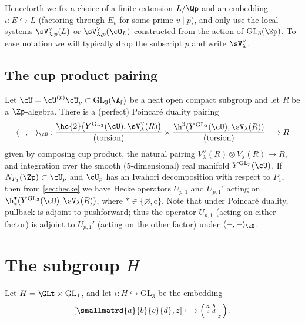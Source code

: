 \documentclass[10pt,reqno,a4paper]{amsart}
\newcommand{\subf}{_{\mathrm{f}}}
\newcommand{\GL}{\mathrm{GL}}
\newcommand{\smallthreemat}[9]{\left(\begin{smallmatrix}
#1 & #2 & #3 \\
#4 & #5 & #6 \\
#7 & #8 & #9\end{smallmatrix}\right)}
\begin{document}
    
    

\begin{remark}\label{rem:L}
	Henceforth we fix a choice of a finite extension $L / \Qp$ and an embedding $\iota : E \hookrightarrow L$ (factoring through $E_v$ for some prime $v \mid p$), and only use the local systems $\sV_{\lambda,p}^\vee(L)$ or $\sV_{\lambda,p}^\vee(\cO_{L})$ constructed from the action of $\GL_3(\Zp)$. To ease notation we will typically drop the subscript $p$ and write $\sV_\lambda^\vee$.
\end{remark}







\subsection{The cup product pairing}\label{sec:cup product pairing}
Let $\cU = \cU^{(p)}\cU_p\subset \GL_3(\A\subf)$ be a neat open compact subgroup and let $R$ be a $\Zp$-algebra. There is a (perfect) Poincar\'e duality pairing
\begin{equation}\label{eq:poincare}
\langle -,-\rangle_{\cU}: \frac{\hc{2}\big(Y^{\GL_3}(\cU), \sV_\lambda^\vee(R)\big)}{\mathrm{(torsion)}}  \times \frac{\h^3(Y^{\GL_3}(\cU),\sV_\lambda(R))}{\mathrm{(torsion)}} \longrightarrow R
\end{equation}
given by composing cup product, the natural pairing $V_\lambda^\vee(R) \otimes V_\lambda (R) \to R$, and integration over the smooth (5-dimensional) real manifold $Y^{\GL_3}(\cU)$. If $N_{P_1}(\Zp) \subset \cU_p$ and $\cU_p$ has an Iwahori decomposition with respect to $P_1$, then from \cref{sec:hecke} we have Hecke operators $U_{p,1}$ and $U_{p,1}'$ acting on $\h^\bullet_*(Y^{\GL_3}(\cU),\sV_\lambda(R))$, where $* \in \{\varnothing, \mathrm{c}\}$. Note that under Poincar\'e duality, pullback is adjoint to pushforward; thus the operator $U_{p,1}$ (acting on either factor) is adjoint to $U_{p,1}'$ (acting on the other factor) under $\langle-,-\rangle_{\cU}$.








\section{The subgroup \texorpdfstring{$H$}{H}}
\label{sect:groups}



\begin{definition}
Let $H = \GLt\times\GL_1$, and let $\iota: H \hookrightarrow \GL_3$ be the embedding
\begin{equation}\label{eq:iota}
	\left[\smallmatrd{a}{b}{c}{d},z\right] \longmapsto \smallthreemat{a}{b}{}{c}{d}{}{}{}{z}.
\end{equation}
\end{definition}
\end{document}
